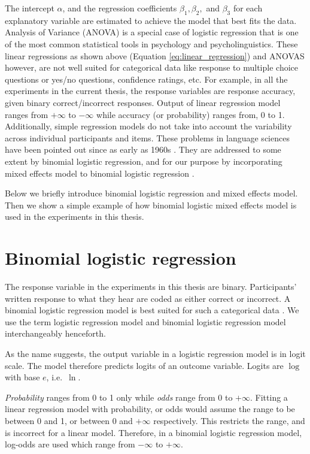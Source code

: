 \documentclass[a4paper, nobind]{templates/ociamthesis}
\begin{document}
The intercept \(\alpha\), and the regression coefficients \(\beta_1, \beta_2,\) and \(\beta_3\) for each explanatory variable are estimated to achieve the model that best fits the data.
Analysis of Variance (ANOVA) is a special case of logistic regression \autocite{Chatterjee2012,Vasishth2022} that is one of the most common statistical tools in psychology and psycholinguistics.
These linear regressions as shown above (Equation \ref{eq:linear_regression}) and ANOVAS however, are not well suited for categorical data like response to multiple choice questions or yes/no questions, confidence ratings, etc.
For example, in all the experiments in the current thesis, the response variables are response accuracy, given binary correct/incorrect responses.
Output of linear regression model ranges from \(+\infty\) to \(-\infty\) while accuracy (or probability) ranges from, 0 to 1.
Additionally, simple regression models do not take into account the variability across individual participants and items.
These problems in language sciences have been pointed out since as early as 1960s \autocite{Coleman1964,Clark1973}.
They are addressed to some extent by binomial logistic regression, and for our purpose by incorporating mixed effects model to binomial logistic regression \autocite{Baayen2008}.

Below we briefly introduce binomial logistic regression and mixed effects model.
Then we show a simple example of how binomial logistic mixed effects model is used in the experiments in this thesis.

\hypertarget{binomial-logistic-regression}{%
\section{Binomial logistic regression}\label{binomial-logistic-regression}}

The response variable in the experiments in this thesis are binary.
Participants' written response to what they hear are coded as either correct or incorrect.
A binomial logistic regression model is best suited for such a categorical data \autocite{Jaeger2008}.
We use the term logistic regression model and binomial logistic regression model interchangeably henceforth.

As the name suggests, the output variable in a logistic regression model is in logit scale.
The model therefore predicts logits of an outcome variable.
Logits are \(\log\) with base \(e\), i.e.~\(\ln\).

\emph{Probability} ranges from 0 to 1 only while \emph{odds} range from 0 to \(+\infty\).
Fitting a linear regression model with probability, or odds would assume the range to be between 0 and 1, or between 0 and \(+\infty\) respectively.
This restricts the range, and is incorrect for a linear model.
Therefore, in a binomial logistic regression model, log-odds are used which range from \(-\infty\) to \(+\infty\).
\end{document}
